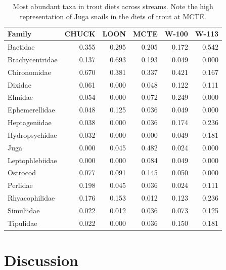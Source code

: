 \documentclass[double,12pt]{beavtex}
\begin{document}
  \begin{table}[t]
  
  \caption{\label{tab:TopDiet}Most abundant taxa in trout diets across streams. Note the high representation of Juga snails in the diets of trout at MCTE.}
  \centering
  \begin{tabular}{lrrrrr}
  \toprule
  Family & CHUCK & LOON & MCTE & W-100 & W-113\\
  \midrule
  Baetidae & 0.355 & 0.295 & 0.205 & 0.172 & 0.542\\
  Brachycentridae & 0.137 & 0.693 & 0.193 & 0.049 & 0.000\\
  Chironomidae & 0.670 & 0.381 & 0.337 & 0.421 & 0.167\\
  Dixidae & 0.061 & 0.000 & 0.048 & 0.122 & 0.111\\
  Elmidae & 0.054 & 0.000 & 0.072 & 0.249 & 0.000\\
  \addlinespace
  Ephemerellidae & 0.048 & 0.125 & 0.036 & 0.049 & 0.000\\
  Heptageniidae & 0.038 & 0.000 & 0.036 & 0.174 & 0.236\\
  Hydropsychidae & 0.032 & 0.000 & 0.000 & 0.049 & 0.181\\
  Juga & 0.000 & 0.045 & 0.482 & 0.024 & 0.000\\
  Leptophlebiidae & 0.000 & 0.000 & 0.084 & 0.049 & 0.000\\
  \addlinespace
  Ostrocod & 0.077 & 0.091 & 0.145 & 0.050 & 0.000\\
  Perlidae & 0.198 & 0.045 & 0.036 & 0.024 & 0.111\\
  Rhyacophilidae & 0.176 & 0.153 & 0.012 & 0.123 & 0.236\\
  Simuliidae & 0.022 & 0.012 & 0.036 & 0.073 & 0.125\\
  Tipulidae & 0.022 & 0.000 & 0.036 & 0.150 & 0.181\\
  \bottomrule
  \end{tabular}
  \end{table}
  
  \chapter*{Discussion}\label{discussion}
  
\end{document}
